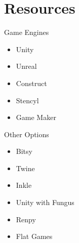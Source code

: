\part{Resources}
\frame{\partpage}

\begin{frame}{Game Engines}
	\begin{itemize}
		\item Unity
		\item Unreal
		\item Construct
		\item Stencyl
		\item Game Maker
	\end{itemize}
\end{frame}

\begin{frame}{Other Options}
	\begin{itemize}
		\item Bitsy
		\item Twine
		\item Inkle
		\item Unity with Fungus
		\item Renpy
		\item Flat Games
	\end{itemize}
\end{frame}

